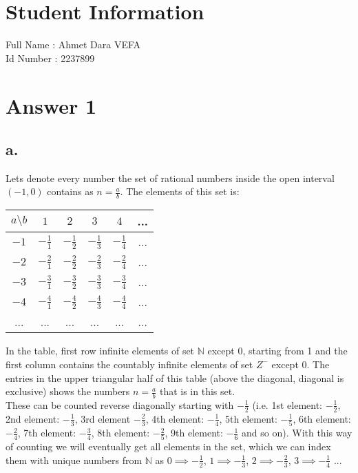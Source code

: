 \documentclass[12pt]{article}
\begin{document}
\section*{Student Information } 
Full Name : Ahmet Dara VEFA \\
Id Number : 2237899 \\

\section*{Answer 1}

\subsection*{a.}

	
Lets denote every number the set of rational numbers inside the open interval $(-1,0)$ contains as $n = \frac{a}{b}.$ The elements of this set is:
\begin{center}
\begin{tabular}{ c| c c c c c}
 $a \setminus b$  &$ 1$ & $2$ & $3$ & $4$ & ...  \\
   \hline
 $ -1$ & $-\frac{1}{1}$ & $-\frac{1}{2}$ & $-\frac{1}{3}$ & $-\frac{1}{4}$ & ...\\
 $ -2$ & $-\frac{2}{1}$ & $-\frac{2}{2}$ & $-\frac{2}{3}$ & $-\frac{2}{4}$ & ...\\
 $ -3$ & $-\frac{3}{1}$ & $-\frac{3}{2}$ & $-\frac{3}{3}$ & $-\frac{3}{4}$ & ...\\
 $ -4$ & $-\frac{4}{1}$ & $-\frac{4}{2}$ & $-\frac{4}{3}$ & $-\frac{4}{4}$ & ...\\
 ... & ... & ... & ... & ... & ...\\
\end{tabular}
\end{center}

In the table, first row infinite elements of set $\mathbb{N}$ except $0$, starting from 1 and the first column contains the countably infinite elements of set $Z^-$ except $0$. The entries in the upper triangular half of this table (above the diagonal, diagonal is exclusive) shows the numbers $n = \frac{a}{b}$ that is in this set. 
\\
These can be counted reverse diagonally starting with $-\frac{1}{2}$ (i.e. 1st element: $-\frac{1}{2}$, 2nd element: $-\frac{1}{3}$, 3rd element $-\frac{2}{3}$, 4th element: $-\frac{1}{4}$, 5th element: $-\frac{1}{5}$, 6th element: $-\frac{2}{4}$, 7th element: $-\frac{3}{4}$, 8th element: $-\frac{2}{5}$, 9th element: $-\frac{1}{6}$ and so on). With this way of counting we will eventually get all elements in the set, which we can index them with unique numbers from $\mathbb{N}$ as $0 \implies -\frac{1}{2}$, $1 \implies -\frac{1}{3}$, $2 \implies -\frac{2}{3}$, $3 \implies -\frac{1}{4}$ ...
\end{document}
